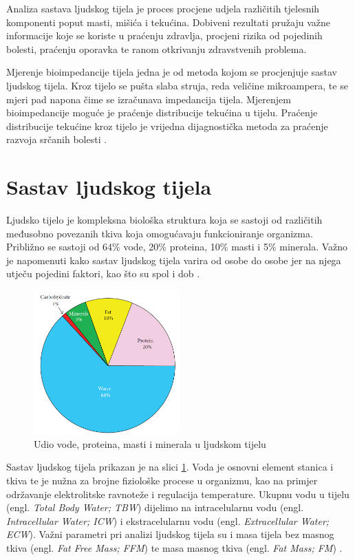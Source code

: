 \documentclass[../diplomski_rad.tex]{subfiles}
\begin{document}
\sloppy

\justifying

Analiza sastava ljudskog tijela je proces procjene udjela različitih tjelesnih komponenti 
poput masti, mišića i tekućina.
Dobiveni rezultati pružaju važne informacije koje se koriste u praćenju zdravlja, 
procjeni rizika od pojedinih bolesti, praćenju oporavka te ranom otkrivanju zdravstvenih problema.

Mjerenje bioimpedancije tijela jedna je od metoda kojom se procjenjuje sastav ljudskog tijela. 
Kroz tijelo se pušta slaba struja, reda veličine mikroampera, te se mjeri pad napona čime se izračunava impedancija tijela. 
Mjerenjem bioimpedancije moguće je praćenje distribucije tekućina u tijelu. 
Praćenje distribucije tekućine kroz tijelo je vrijedna dijagnostička metoda 
za praćenje razvoja srčanih bolesti \cite{Abassi2022}.

\section{Sastav ljudskog tijela}

Ljudsko tijelo je kompleksna biološka struktura koja se sastoji od različitih međusobno povezanih tkiva koja 
omogućavaju funkcioniranje organizma. Približno se sastoji od 
64\% vode,
20\% proteina,
10\% masti 
i 5\% minerala.
Važno je napomenuti kako sastav ljudskog tijela varira od osobe do osobe jer na njega utječu 
pojedini faktori, kao što su spol i dob \cite{Bera2014}.  

\begin{figure}[htb]
    \centering
    \includegraphics[width=0.5\textwidth]{Figures/sastav_tijela_2.png} 
    \caption{Udio vode, proteina, masti i minerala u ljudskom tijelu \cite{Bera2014}}
    \label{slk:sastav_tijela}
\end{figure}

Sastav ljudskog tijela prikazan je na slici \ref{slk:sastav_tijela}.
Voda je osnovni element stanica i tkiva te je nužna za brojne fiziološke procese u organizmu, 
kao na primjer održavanje elektrolitske ravnoteže i regulacija temperature.
Ukupnu vodu u tijelu (engl. \textit{Total Body Water; TBW}) 
dijelimo na intracelularnu vodu (engl. \textit{Intracellular Water; ICW}) i ekstracelularnu vodu (engl. \textit{Extracellular Water; ECW}). 
Važni parametri pri analizi ljudskog tijela su i masa tijela bez masnog tkiva (engl. \textit{Fat Free Mass; FFM}) 
te masa masnog tkiva (engl. \textit{Fat Mass; FM}) \cite{Bera2014}.
\end{document}
